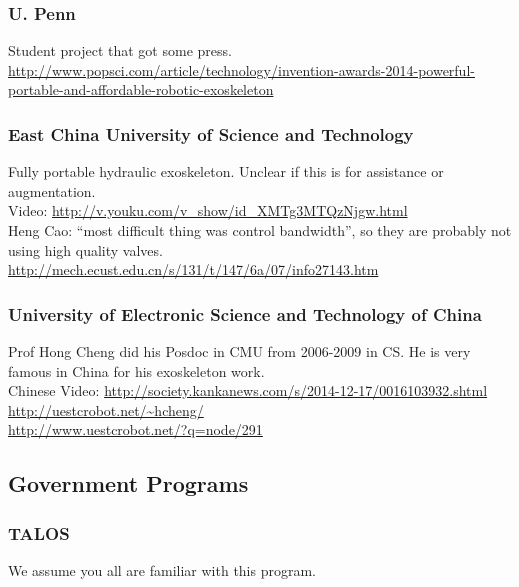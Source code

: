 \subsubsection{U. Penn}

\noindent
Student project that got some press.\\
\url{http://www.popsci.com/article/technology/invention-awards-2014-powerful-portable-and-affordable-robotic-exoskeleton}\\

\subsubsection{East China University of Science and Technology}

\noindent
Fully portable hydraulic exoskeleton. Unclear if this is for
assistance or augmentation.\\
Video: \url{http://v.youku.com/v_show/id_XMTg3MTQzNjgw.html}\\
Heng Cao: ``most difficult thing was control bandwidth'', so they
are probably not using high quality valves.
\url{http://mech.ecust.edu.cn/s/131/t/147/6a/07/info27143.htm}

\subsubsection{University of Electronic Science and Technology of China}

\noindent
Prof Hong Cheng did his Posdoc in CMU from 2006-2009 in CS.
He is very famous in China for his exoskeleton work.\\
Chinese Video: \url{http://society.kankanews.com/s/2014-12-17/0016103932.shtml}\\
\url{http://uestcrobot.net/~hcheng/}\\
\url{http://www.uestcrobot.net/?q=node/291}\\


\subsection{Government Programs}

\subsubsection{TALOS}

\noindent
We assume you all are familiar with this program.

